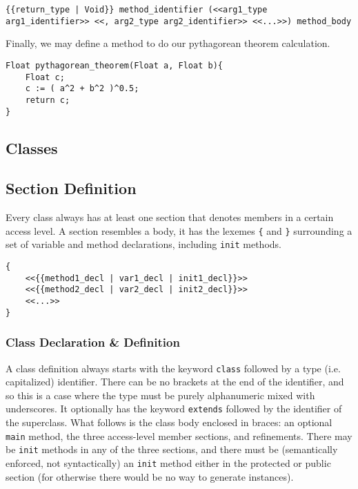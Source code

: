 \begin{lstlisting}
{{return_type | Void}} method_identifier (<<arg1_type arg1_identifier>> <<, arg2_type arg2_identifier>> <<...>>) method_body
\end{lstlisting}

Finally, we may define a method to do our pythagorean theorem calculation.

\begin{lstlisting}[backgroundcolor=\color{tintedorange},caption=Method Definition for the Pythagorean Theorem]
Float pythagorean_theorem(Float a, Float b){
    Float c;
    c := ( a^2 + b^2 )^0.5;
    return c;
}
\end{lstlisting}

\subsection{Classes}

\subsection{Section Definition}
Every class always has at least one section that denotes members in a certain access level. A section resembles a body, it has the lexemes \verb!{! and \verb!}! surrounding a set of variable and method declarations, including \verb!init! methods.

\begin{lstlisting}
{
	<<{{method1_decl | var1_decl | init1_decl}}>>
	<<{{method2_decl | var2_decl | init2_decl}}>>
	<<...>>
}
\end{lstlisting}

\subsubsection{Class Declaration \& Definition}
A class definition always starts with the keyword \verb!class! followed by a type (i.e. capitalized) identifier. There can be no brackets at the end of the identifier, and so this is a case where the type must be purely alphanumeric mixed with underscores. It optionally has the keyword \verb!extends! followed by the identifier of the superclass. What follows is the class body enclosed in braces: an optional \verb!main! method, the three access-level member sections, and refinements. There may be \verb!init! methods in any of the three sections, and there must be (semantically enforced, not syntactically) an \verb!init! method either in the protected or public section (for otherwise there would be no way to generate instances).

